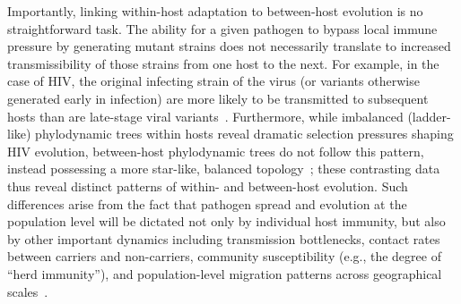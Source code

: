 Importantly, linking within-host adaptation to between-host evolution is no straightforward task. The ability for a given pathogen to bypass local immune pressure by generating mutant strains does not necessarily translate to increased transmissibility of those strains from one host to the next. For example, in the case of HIV, the original infecting strain of the virus (or variants otherwise generated early in infection) are more likely to be transmitted to subsequent hosts than are late-stage viral variants~\cite{redd2012previously,theys2018impact}. Furthermore, while imbalanced (ladder-like) phylodynamic trees within hosts reveal dramatic selection pressures shaping HIV evolution, between-host phylodynamic trees do not follow this pattern, instead possessing a more star-like, balanced topology~\cite{theys2018impact,grenfell2004unifying}; these contrasting data thus reveal distinct patterns of within- and between-host evolution. Such differences arise from the fact that pathogen spread and evolution at the population level will be dictated not only by individual host immunity, but also by other important dynamics including transmission bottlenecks, contact rates between carriers and non-carriers, community susceptibility (e.g., the degree of ``herd immunity''), and population-level migration patterns across geographical scales~\cite{grenfell2004unifying,saad2022immuno,bergstrom1999transmission,cardenas2022genomic}.

